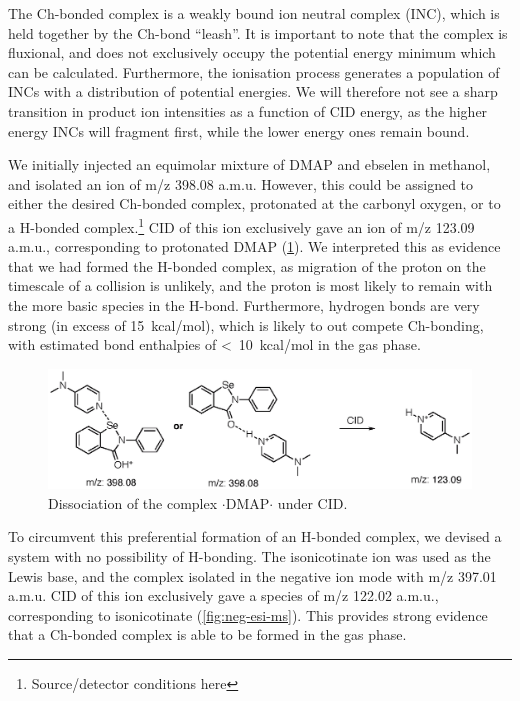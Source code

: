 \begin{refsection}
The Ch-bonded complex is a weakly bound ion neutral complex (INC), which is held together by the Ch-bond ``leash''.\autocite{McAdoo1993}
It is important to note that the complex is fluxional, and does not exclusively occupy the potential energy minimum which can be calculated.
Furthermore, the ionisation process generates a population of INCs with a distribution of potential energies.
We will therefore not see a sharp transition in product ion intensities as a function of CID energy, as the higher energy INCs will fragment first, while the lower energy ones remain bound.

We initially injected an equimolar mixture of DMAP and ebselen  in methanol, and isolated an ion of m/z 398.08 a.m.u.
However, this could be assigned to either the desired Ch-bonded complex, protonated at the carbonyl oxygen, or to a H-bonded complex.\footnote{Source/detector conditions here}
CID of this ion exclusively gave an ion of m/z 123.09 a.m.u., corresponding to protonated DMAP (\cref{fig:pos-esi-ms}).
We interpreted this as evidence that we had formed the H-bonded complex, as migration of the proton on the timescale of a collision is unlikely, and the proton is most likely to remain with the more basic species in the H-bond.
Furthermore,  hydrogen bonds are very strong (in excess of 15~kcal/mol)\autocite{Emsley1980}, which is likely to out compete Ch-bonding, with estimated bond enthalpies of <~10~kcal/mol in the gas phase.

\begin{figure}
    \centering
    \includegraphics[scale=0.74]{Figures/pos-esi-ms.eps}
    \caption[Positive mode ESI of $ \cdot $DMAP$ \cdot $.]{Dissociation of the complex $ \cdot $DMAP$ \cdot $ under CID.}\label{fig:pos-esi-ms}
\end{figure}

To circumvent this preferential formation of an H-bonded complex, we devised a system with no possibility of H-bonding.
The isonicotinate ion was used as the Lewis base, and the complex isolated in the negative ion mode with m/z 397.01 a.m.u.
CID of this ion exclusively gave a species of m/z 122.02 a.m.u., corresponding to isonicotinate (\cref{fig:neg-esi-ms}).
This provides strong evidence that a Ch-bonded complex is able to be formed in the gas phase.


\end{refsection}
